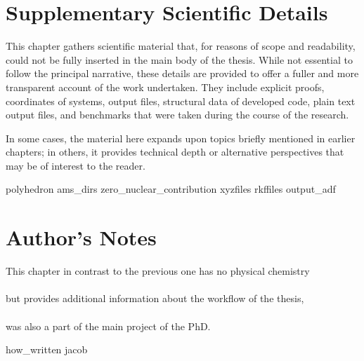 \appendix
\renewcommand{\thetable}{SI\arabic{table}}%

\chapter{Supplementary Scientific Details}

\vspace{2em}%

This chapter gathers scientific material that, for reasons of scope and
readability, could not be fully inserted in the main body of the thesis. While
not essential to follow the principal narrative, these details are provided to
offer a fuller and more transparent account of the work undertaken. They
include explicit proofs, coordinates of systems, output files, structural data
of developed code, plain text output files, and benchmarks that were taken
during the course of the research.

\vspace{2em}%
In some cases, the material here expands upon topics
briefly mentioned in earlier chapters; in others, it provides technical depth
or alternative perspectives that may be of interest to the reader.

{polyhedron}
{ams_dirs}
{zero_nuclear_contribution}
{xyzfiles}
{rkffiles}
{output_adf}

\chapter{Author's Notes}

\vspace{5em}%
\hspace*{1em}This chapter in contrast to the previous one has no physical chemistry\\ [-0.5em]
\\ [-0.5em]
\hspace*{2em}but provides additional information about the workflow of the thesis,\\ [-0.5em]
\\ [-0.5em] 
\hspace*{1em}was also a part of the main project of the PhD.%

{how_written}
{jacob}

